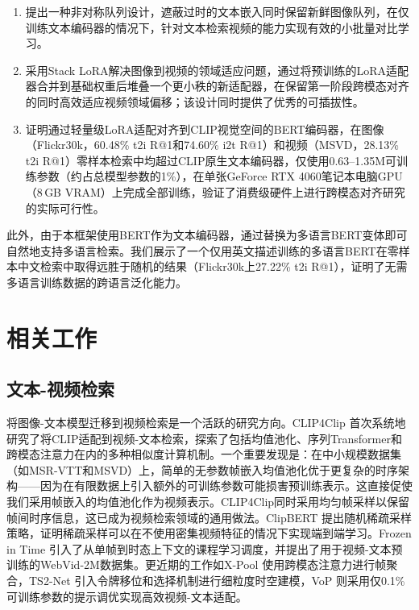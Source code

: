 \documentclass[10pt,a4paper]{ctexart}
\begin{document}
\begin{enumerate}
  \item 提出一种非对称队列设计，遮蔽过时的文本嵌入同时保留新鲜图像队列，在仅训练文本编码器的情况下，针对文本检索视频的能力实现有效的小批量对比学习。
  \item 采用Stack LoRA解决图像到视频的领域适应问题，通过将预训练的LoRA适配器合并到基础权重后堆叠一个更小秩的新适配器，在保留第一阶段跨模态对齐的同时高效适应视频领域偏移；该设计同时提供了优秀的可插拔性。
  \item 证明通过轻量级LoRA适配对齐到CLIP视觉空间的BERT编码器，在图像（Flickr30k，60.48\% t2i R@1和74.60\% i2t R@1）和视频（MSVD，28.13\% t2i R@1）零样本检索中均超过CLIP原生文本编码器，仅使用0.63--1.35M可训练参数（约占总模型参数的1\%），在单张GeForce RTX 4060笔记本电脑GPU（8\,GB VRAM）上完成全部训练，验证了消费级硬件上进行跨模态对齐研究的实际可行性。
\end{enumerate}

此外，由于本框架使用BERT作为文本编码器，通过替换为多语言BERT变体即可自然地支持多语言检索。我们展示了一个仅用英文描述训练的多语言BERT在零样本中文检索中取得远胜于随机的结果（Flickr30k上27.22\% t2i R@1），证明了无需多语言训练数据的跨语言泛化能力。

\section{相关工作}

\subsection{文本-视频检索}

将图像-文本模型迁移到视频检索是一个活跃的研究方向。CLIP4Clip \citep{luo2022clip4clip}首次系统地研究了将CLIP适配到视频-文本检索，探索了包括均值池化、序列Transformer和跨模态注意力在内的多种相似度计算机制。一个重要发现是：在中小规模数据集（如MSR-VTT和MSVD）上，简单的无参数帧嵌入均值池化优于更复杂的时序架构——因为在有限数据上引入额外的可训练参数可能损害预训练表示。这直接促使我们采用帧嵌入的均值池化作为视频表示。CLIP4Clip同时采用均匀帧采样以保留帧间时序信息，这已成为视频检索领域的通用做法。ClipBERT \citep{lei2021clipbert}提出随机稀疏采样策略，证明稀疏采样可以在不使用密集视频特征的情况下实现端到端学习。Frozen in Time \citep{bain2021frozen}引入了从单帧到时态上下文的课程学习调度，并提出了用于视频-文本预训练的WebVid-2M数据集。更近期的工作如X-Pool \citep{gorti2022xpool}使用跨模态注意力进行帧聚合，TS2-Net \citep{liu2022ts2net}引入令牌移位和选择机制进行细粒度时空建模，VoP \citep{huang2023vop}则采用仅0.1\%可训练参数的提示调优实现高效视频-文本适配。
\end{document}
